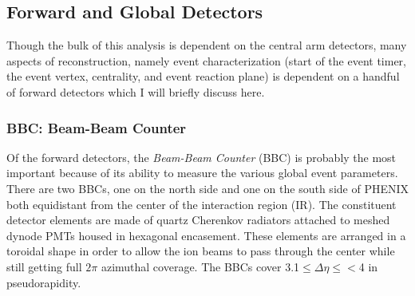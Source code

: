 \subsection{Forward and Global Detectors}
Though the bulk of this analysis is dependent on the central arm detectors, many aspects of reconstruction, namely event characterization (start of the event timer, the event vertex, centrality, and event reaction plane) is dependent on a handful of forward detectors which I will briefly discuss here.

\subsubsection{BBC: Beam-Beam Counter}
Of the forward detectors, the \textit{Beam-Beam Counter} (BBC) is probably the most important because of its ability to measure the various global event parameters. There are two BBCs, one on the north side and one on the south side of PHENIX both equidistant from the center of the interaction region (IR). The constituent detector elements are made of quartz Cherenkov radiators attached to meshed dynode PMTs housed in hexagonal encasement. These elements are arranged in a toroidal shape in order to allow the ion beams to pass through the center while still getting full $2\pi$ azimuthal coverage. The BBCs cover 3.1$\leq \Delta \eta \leq<$4 in pseudorapidity.
